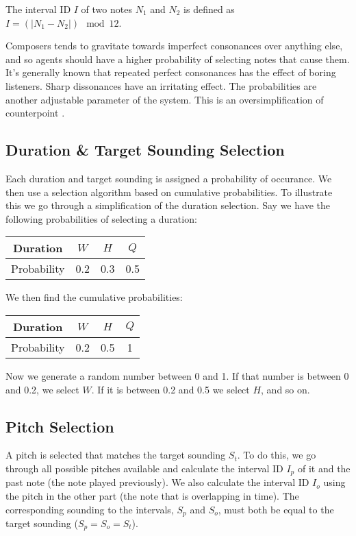 \documentclass[12pt]{article}
\begin{document}
	\noindent The interval ID $I$ of two notes $N_1$ and $N_2$ is defined as
	$I = (|N_1-N_2|)\mod 12$.
	
	Composers tends to gravitate towards imperfect consonances over anything else, and so agents should have a higher probability of selecting notes that cause them. It's generally known that repeated perfect consonances has the effect of boring listeners. Sharp dissonances have an irritating effect. The probabilities are another adjustable parameter of the system. This is an oversimplification of counterpoint \cite{mann1965study}.
	
	\subsection{Duration \& Target Sounding Selection}
	Each duration and target sounding is assigned a probability of occurance. We then use a selection algorithm based on cumulative probabilities. To illustrate this we go through a simplification of the duration selection. Say we have the following probabilities of selecting a duration:
	
	\begin{tabular}{c | c | c | c}
		Duration & $W$ & $H$ & $Q$ \\\hline
		Probability &0.2&0.3&0.5
	\end{tabular}

	We then find the cumulative probabilities:
	
	\begin{tabular}{c | c | c | c}
		Duration & $W$ & $H$ & $Q$ \\\hline
		Probability &0.2&0.5&1
	\end{tabular}

	Now we generate a random number between 0 and 1. If that number is between 0 and 0.2, we select $W$. If it is between 0.2 and 0.5 we select $H$, and so on.
	
	\subsection{Pitch Selection}
	A pitch is selected that matches the target sounding $S_t$. To do this, we go through all possible pitches available and calculate the interval ID $I_p$ of it and the past note (the note played previously). We also calculate the interval ID $I_o$ using the pitch in the other part (the note that is overlapping in time). 
	The corresponding sounding to the intervals, $S_p$ and $S_o$, must both be equal to the target sounding ($S_p = S_o = S_t$). 
	
\end{document}
